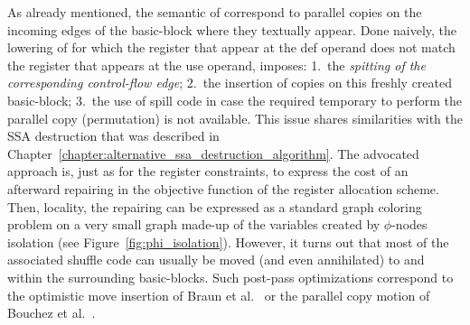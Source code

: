 {%
As already mentioned, the semantic of \phifuns correspond to parallel copies on the incoming edges of the basic-block where they textually appear.
Done naively, the lowering of \phifuns for which the register that appear at the def operand does not match the register that appears at the use operand, imposes:
1.~the \emph{spitting of the corresponding control-flow edge};
2.~the insertion of copies on this freshly created basic-block;
3.~the use of spill code in case the required temporary to perform the parallel copy (permutation) is not available.
This issue shares similarities with the SSA destruction that was described in Chapter~\ref{chapter:alternative_ssa_destruction_algorithm}.
The advocated approach is, just as for the register constraints, to express the cost of an afterward repairing in the objective function of the register allocation scheme.
Then, locality, the repairing can be expressed as a standard graph coloring problem on a very small graph made-up of the variables created by $\phi$-nodes isolation (see Figure~\ref{fig:phi_isolation}).
However, it turns out that most of the associated shuffle code can usually be moved (and even annihilated) to and within the surrounding basic-blocks.
Such post-pass optimizations correspond to the optimistic move insertion of Braun et al.~\cite{braun2010preference} or the parallel copy motion of Bouchez et al.~\cite{Bouchez:2010:PCM}.

}
